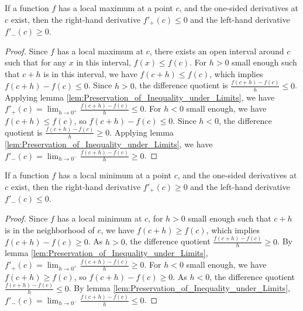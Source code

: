 \begin{lemma}
    \label{lem:One_Sided_Derivatives_at_a_Local_Maximum}
    If a function $f$ has a local maximum at a point $c$, and the one-sided derivatives at $c$ exist, then the right-hand derivative $f'_+(c) \leq 0$ and the left-hand derivative $f'_-(c) \geq 0$.
\end{lemma}

\begin{proof}
    Since $f$ has a local maximum at $c$, there exists an open interval around $c$ such that for any $x$ in this interval, $f(x) \leq f(c)$.
    For $h > 0$ small enough such that $c+h$ is in this interval, we have $f(c+h) \leq f(c)$, which implies $f(c+h) - f(c) \leq 0$. Since $h > 0$, the difference quotient is $\frac{f(c+h)-f(c)}{h} \leq 0$. Applying lemma \ref{lem:Preservation_of_Inequality_under_Limits}, we have $f'_+(c) = \lim_{h \to 0^+} \frac{f(c+h)-f(c)}{h} \leq 0$.
    For $h < 0$ small enough, we have $f(c+h) \leq f(c)$, so $f(c+h) - f(c) \leq 0$. Since $h < 0$, the difference quotient is $\frac{f(c+h)-f(c)}{h} \geq 0$. Applying lemma \ref{lem:Preservation_of_Inequality_under_Limits}, we have $f'_-(c) = \lim_{h \to 0^-} \frac{f(c+h)-f(c)}{h} \geq 0$.
\end{proof}

\begin{lemma}
    \label{lem:One_Sided_Derivatives_at_a_Local_Minimum}
    If a function $f$ has a local minimum at a point $c$, and the one-sided derivatives at $c$ exist, then the right-hand derivative $f'_+(c) \geq 0$ and the left-hand derivative $f'_-(c) \leq 0$.
\end{lemma}

\begin{proof}
    Since $f$ has a local minimum at $c$, for $h > 0$ small enough such that $c+h$ is in the neighborhood of $c$, we have $f(c+h) \geq f(c)$, which implies $f(c+h) - f(c) \geq 0$. As $h > 0$, the difference quotient $\frac{f(c+h)-f(c)}{h} \geq 0$. By lemma \ref{lem:Preservation_of_Inequality_under_Limits}, $f'_+(c) = \lim_{h \to 0^+} \frac{f(c+h)-f(c)}{h} \geq 0$.
    For $h < 0$ small enough, we have $f(c+h) \geq f(c)$, so $f(c+h) - f(c) \geq 0$. As $h < 0$, the difference quotient $\frac{f(c+h)-f(c)}{h} \leq 0$. By lemma \ref{lem:Preservation_of_Inequality_under_Limits}, $f'_-(c) = \lim_{h \to 0^-} \frac{f(c+h)-f(c)}{h} \leq 0$.
\end{proof}

